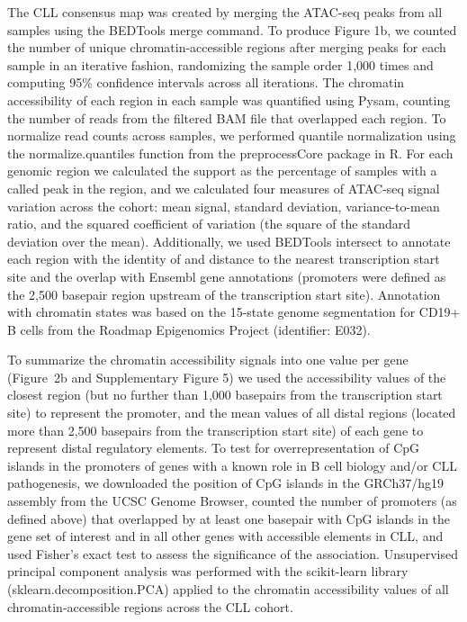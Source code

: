 \documentclass[10pt,]{article}
\begin{document}
The CLL consensus map was created by merging the ATAC-seq peaks from all
samples using the BEDTools\citep{Quinlan2010} merge command. To produce
Figure 1b, we counted the number of unique chromatin-accessible regions
after merging peaks for each sample in an iterative fashion, randomizing
the sample order 1,000 times and computing 95\% confidence intervals
across all iterations. The chromatin accessibility of each region in
each sample was quantified using Pysam, counting the number of reads
from the filtered BAM file that overlapped each region. To normalize
read counts across samples, we performed quantile normalization using
the normalize.quantiles function from the preprocessCore package in R.
For each genomic region we calculated the support as the percentage of
samples with a called peak in the region, and we calculated four
measures of ATAC-seq signal variation across the cohort: mean signal,
standard deviation, variance-to-mean ratio, and the squared coefficient
of variation (the square of the standard deviation over the mean).
Additionally, we used BEDTools intersect to annotate each region with
the identity of and distance to the nearest transcription start site and
the overlap with Ensembl gene annotations (promoters were defined as the
2,500 basepair region upstream of the transcription start site).
Annotation with chromatin states was based on the 15-state genome
segmentation for CD19+ B cells from the Roadmap Epigenomics
Project\citep{Ernst2015} (identifier: E032).

To summarize the chromatin accessibility signals into one value per gene
(Figure~2b and Supplementary Figure 5) we used the accessibility values
of the closest region (but no further than 1,000 basepairs from the
transcription start site) to represent the promoter, and the mean values
of all distal regions (located more than 2,500 basepairs from the
transcription start site) of each gene to represent distal regulatory
elements. To test for overrepresentation of CpG islands in the promoters
of genes with a known role in B cell biology and/or CLL pathogenesis, we
downloaded the position of CpG islands in the GRCh37/hg19 assembly from
the UCSC Genome Browser\citep{Rosenbloom2015}, counted the number of
promoters (as defined above) that overlapped by at least one basepair
with CpG islands in the gene set of interest and in all other genes with
accessible elements in CLL, and used Fisher's exact test to assess the
significance of the association. Unsupervised principal component
analysis was performed with the scikit-learn\citep{Pedregosa2011}
library (sklearn.decomposition.PCA) applied to the chromatin
accessibility values of all chromatin-accessible regions across the CLL
cohort.
\end{document}

